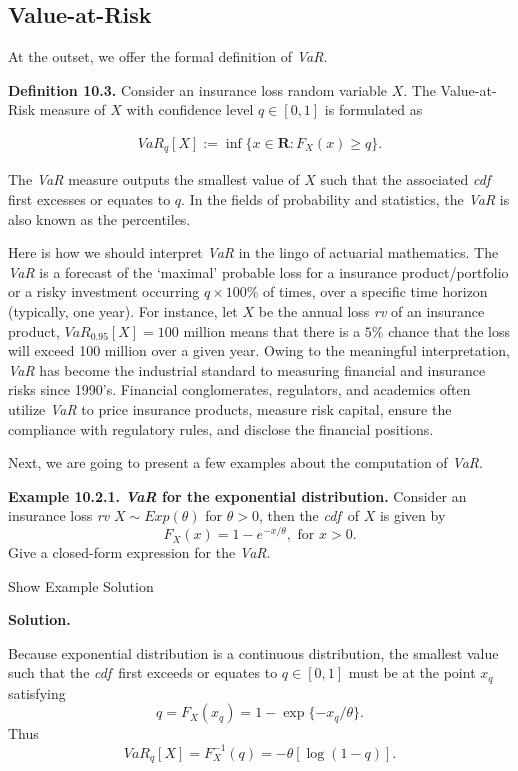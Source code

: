\documentclass[]{book}
\theoremstyle{definition}
\theoremstyle{definition}
\theoremstyle{definition}
\theoremstyle{remark}
\begin{document}
\subsection{Value-at-Risk}\label{value-at-risk}

At the outset, we offer the formal definition of \emph{VaR}.

\textbf{Definition 10.3.} Consider an insurance loss random variable
\(X\). The Value-at-Risk measure of \(X\) with confidence level
\(q\in [0,1]\) is formulated as

\begin{eqnarray}
VaR_q[X]:=\inf\{x\in \mathbf{R}:F_X(x)\geq q\}.
\label{eq:Value-at-Risk}
\end{eqnarray}

The \emph{VaR} measure outputs the smallest value of \(X\) such that the
associated \emph{cdf} first excesses or equates to \(q\). In the fields
of probability and statistics, the \emph{VaR} is also known as the
percentiles.

Here is how we should interpret \emph{VaR} in the lingo of actuarial
mathematics. The \emph{VaR} is a forecast of the `maximal' probable loss
for a insurance product/portfolio or a risky investment occurring
\(q\times 100\%\) of times, over a specific time horizon (typically, one
year). For instance, let \(X\) be the annual loss \emph{rv} of an
insurance product, \(VaR_{0.95}[X]=100\) million means that there is a
\(5\%\) chance that the loss will exceed 100 million over a given year.
Owing to the meaningful interpretation, \emph{VaR} has become the
industrial standard to measuring financial and insurance risks since
1990's. Financial conglomerates, regulators, and academics often utilize
\emph{VaR} to price insurance products, measure risk capital, ensure the
compliance with regulatory rules, and disclose the financial positions.

Next, we are going to present a few examples about the computation of
\emph{VaR}.

\textbf{Example 10.2.1. \emph{VaR} for the exponential distribution.}
Consider an insurance loss \emph{rv} \(X\sim Exp(\theta)\) for
\(\theta>0\), then the \emph{cdf}~of \(X\) is given by \[
F_X(x)=1-e^{-x/\theta}, \text{ for } x>0.
\] Give a closed-form expression for the \emph{VaR}.

Show Example Solution

\hypertarget{toggleExamplePortMgt.2.1}{}
\textbf{Solution.}

Because exponential distribution is a continuous distribution, the
smallest value such that the \emph{cdf}~first exceeds or equates to
\(q \in [0,1]\) must be at the point \(x_q\) satisfying \[
q=F_X(x_q)=1-\exp\{-x_q/\theta \}.
\] Thus \[
VaR_q[X]=F_X^{-1}(q)=-\theta[\log(1-q)].
\]
\end{document}
